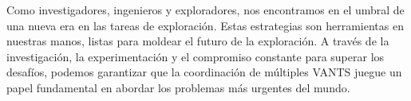 \documentclass[sigconf]{acmart}
\begin{document}

Como investigadores, ingenieros y exploradores, nos encontramos en el umbral de una nueva era en las tareas de exploración. Estas estrategias son herramientas en nuestras manos, listas para moldear el futuro de la exploración. A través de la investigación, la experimentación y el compromiso constante para superar los desafíos, podemos garantizar que la coordinación de múltiples VANTS juegue un papel fundamental en abordar los problemas más urgentes del mundo.



\newpage


\end{document}
